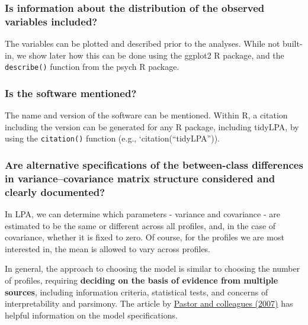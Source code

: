 \documentclass[man]{apa6}
\begin{document}
\hypertarget{is-information-about-the-distribution-of-the-observed-variables-included}{%
\subsubsection{Is information about the distribution of the observed variables included?}\label{is-information-about-the-distribution-of-the-observed-variables-included}}

The variables can be plotted and described prior to the analyses. While not built-in, we show later how this can be done using the ggplot2 R package, and the \texttt{describe()} function from the psych R package.

\hypertarget{is-the-software-mentioned}{%
\subsubsection{Is the software mentioned?}\label{is-the-software-mentioned}}

The name and version of the software can be mentioned. Within R, a citation including the version can be generated for any R package, including tidyLPA, by using the \texttt{citation()} function (e.g., `citation(\enquote{tidyLPA})).

\hypertarget{are-alternative-specifications-of-the-between-class-differences-in-variancecovariance-matrix-structure-considered-and-clearly-documented}{%
\subsubsection{Are alternative specifications of the between-class differences in variance--covariance matrix structure considered and clearly documented?}\label{are-alternative-specifications-of-the-between-class-differences-in-variancecovariance-matrix-structure-considered-and-clearly-documented}}

In LPA, we can determine which parameters - variance and covariance - are
estimated to be the same or different across all profiles, and, in the case of
covariance, whether it is fixed to zero. Of course, for the profiles we are most
interested in, the mean is allowed to vary across profiles.

In general, the approach to choosing the model is similar to choosing the number
of profiles, requiring \textbf{deciding on the basis of evidence from multiple
sources}, including information criteria, statistical tests, and concerns of
interpretability and parsimony. The article by \href{https://www.sciencedirect.com/science/article/pii/S0361476X06000543}{Pastor and colleagues
(2007)} has
helpful information on the model specifications.
\end{document}
